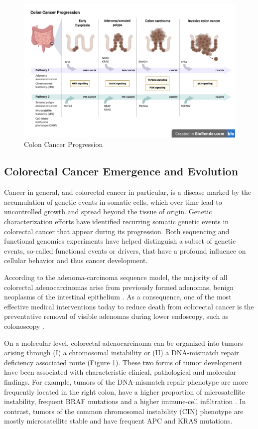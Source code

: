 \begin{flushleft}
\begin{figure}[h]
\centering
\includegraphics[scale=.35]{figures/colon_cancer_progression.png}
\caption{Colon Cancer Progression}
\label{colon_cancer_progression}
\end{figure}

\subsection{Colorectal Cancer Emergence and Evolution}
Cancer in general, and colorectal cancer in particular, is a disease marked by the accumulation of genetic events in somatic cells, which over time lead to uncontrolled growth and spread beyond the tissue of origin. Genetic characterization efforts have identified recurring somatic genetic events in colorectal cancer that appear during its progression. Both sequencing and functional genomics experiments have helped distinguish a subset of genetic events, so-called functional events or drivers, that have a profound influence on cellular behavior and thus cancer development. 

According to the adenoma-carcinoma sequence model, the majority of all colorectal adenocarcinomas arise from previously formed adenomas, benign neoplasms of the intestinal epithelium \cite{Cho1992}. As a consequence, one of the most effective medical interventions today to reduce death from colorectal cancer is the preventative removal of visible adenomas during lower endoscopy, such as colonoscopy \cite{Nishihara2013Long-TermEndoscopy}.\par

On a molecular level, colorectal adenocarcinoma can be organized into tumors arising through (I) a chromosomal instability or (II) a DNA-mismatch repair deficiency associated route \cite{Markowitz2009} (Figure \ref{colon_cancer_progression}). These two forms of tumor development have been associated with characteristic clinical, pathological and molecular findings. For example, tumors of the DNA-mismatch repair phenotype are more frequently located in the right colon, have a higher proportion of microsatellite instability, frequent BRAF mutations and a higher immune-cell infiltration \cite{Markowitz2009}. In contrast, tumors of the common chromosomal instability (CIN) phenotype are mostly microsatellite stable and have frequent APC and KRAS mutations. \par 


\end{flushleft}
